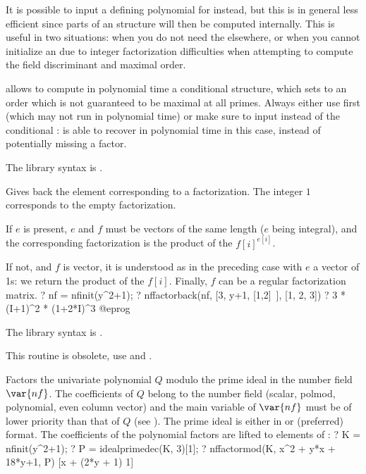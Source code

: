 It is possible to input a defining polynomial for 
instead, but this is in general less efficient since parts of an 
structure will then be computed internally. This is useful in two
situations: when you do not need the  elsewhere, or when you cannot
initialize an  due to integer factorization difficulties when
attempting to compute the field discriminant and maximal order.

  allows to compute in polynomial
time a conditional  structure, which sets  to an order
which is not guaranteed to be maximal at all primes. Always either use
 first (which may not run in polynomial time) or make sure
to input  instead of the conditional :  is
able to recover in polynomial time in this case, instead of potentially
missing a factor.

The library syntax is .

\label{se:nffactorback}
Gives back the  element corresponding to a factorization.
The integer $1$ corresponds to the empty factorization.

If $e$ is present, $e$ and $f$ must be vectors of the same length ($e$ being
integral), and the corresponding factorization is the product of the
$f[i]^{e[i]}$.

If not, and $f$ is vector, it is understood as in the preceding case with $e$
a vector of 1s: we return the product of the $f[i]$. Finally, $f$ can be a
regular factorization matrix.
\bprog
? nf = nfinit(y^2+1);
? nffactorback(nf, [3, y+1, [1,2]~], [1, 2, 3])
? 3 * (I+1)^2 * (1+2*I)^3
@eprog

The library syntax is .

\label{se:nffactormod}
This routine is obsolete, use  and .

Factors the univariate polynomial $Q$ modulo the prime ideal  in
the number field $\var{nf}$. The coefficients of $Q$ belong to the number
field (scalar, polmod, polynomial, even column vector) and the main variable
of $\var{nf}$ must be of lower priority than that of $Q$ (see
). The prime ideal  is either in
 or (preferred)  format. The coefficients
of the polynomial factors are lifted to elements of :
\bprog
? K = nfinit(y^2+1);
? P = idealprimedec(K, 3)[1];
? nffactormod(K, x^2 + y*x + 18*y+1, P)
[x + (2*y + 1) 1]

